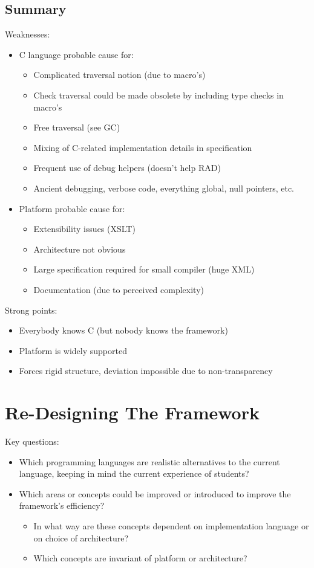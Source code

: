 \documentclass[final,a4paper,12pt]{article}
\begin{document}
\subsection{Summary}
\label{subsec:analysis-summary}
Weaknesses:
\begin{itemize}
	\item C language probable cause for:
	\begin{itemize}
		\item Complicated traversal notion (due to macro's)
		\item Check traversal could be made obsolete by including type checks in macro's
		\item Free traversal (see GC)
		\item Mixing of C-related implementation details in specification
		\item Frequent use of debug helpers (doesn't help RAD)
		\item Ancient debugging, verbose code, everything global, null pointers, etc.
	\end{itemize}
	\item Platform probable cause for:
	\begin{itemize}
		\item Extensibility issues (XSLT)
		\item Architecture not obvious
		\item Large specification required for small compiler (huge XML)
		\item Documentation (due to perceived complexity)
	\end{itemize}
\end{itemize}

Strong points:
\begin{itemize}
	\item Everybody knows C (but nobody knows the framework)
	\item Platform is widely supported
	\item Forces rigid structure, deviation impossible due to non-transparency
\end{itemize}


\section{Re-Designing The Framework}
Key questions:
\begin{itemize}
	\item Which programming languages are realistic alternatives to the current language, keeping in mind the current experience of students?
	\item Which areas or concepts could be improved or introduced to improve the framework's efficiency?
	\begin{itemize}
		\item In what way are these concepts dependent on implementation language or on choice of architecture?
		\item Which concepts are invariant of platform or architecture?
	\end{itemize}
\end{itemize}
\end{document}
